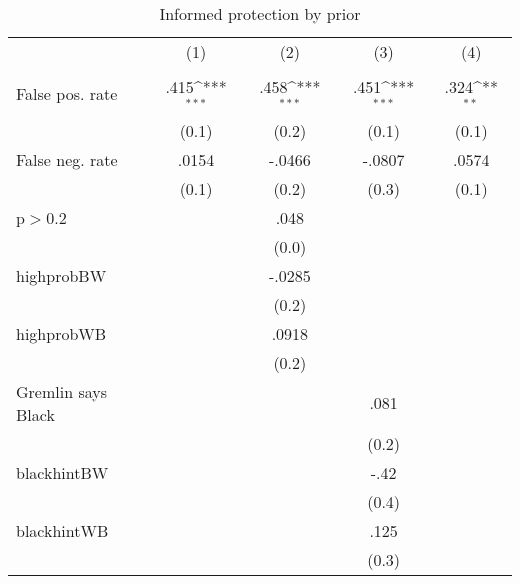 \begin{table}[htbp]\centering
\def\sym#1{\ifmmode^{#1}\else\(^{#1}\)\fi}
\caption{Informed protection by prior}
\begin{tabular}{l*{4}{c}}
\hline\hline
                &\multicolumn{1}{c}{(1)}&\multicolumn{1}{c}{(2)}&\multicolumn{1}{c}{(3)}&\multicolumn{1}{c}{(4)}\\
                &\multicolumn{1}{c}{}&\multicolumn{1}{c}{}&\multicolumn{1}{c}{}&\multicolumn{1}{c}{}\\
\hline
False pos. rate &     .415\sym{***}&     .458\sym{***}&     .451\sym{***}&     .324\sym{**} \\
                &    (0.1)         &    (0.2)         &    (0.1)         &    (0.1)         \\
False neg. rate &    .0154         &   -.0466         &   -.0807         &    .0574         \\
                &    (0.1)         &    (0.2)         &    (0.3)         &    (0.1)         \\
p$>$0.2         &                  &     .048         &                  &                  \\
                &                  &    (0.0)         &                  &                  \\
highprobBW      &                  &   -.0285         &                  &                  \\
                &                  &    (0.2)         &                  &                  \\
highprobWB      &                  &    .0918         &                  &                  \\
                &                  &    (0.2)         &                  &                  \\
Gremlin says Black&                  &                  &     .081         &                  \\
                &                  &                  &    (0.2)         &                  \\
blackhintBW     &                  &                  &     -.42         &                  \\
                &                  &                  &    (0.4)         &                  \\
blackhintWB     &                  &                  &     .125         &                  \\
                &                  &                  &    (0.3)         &                  \\

\end{tabular}
\end{table}
